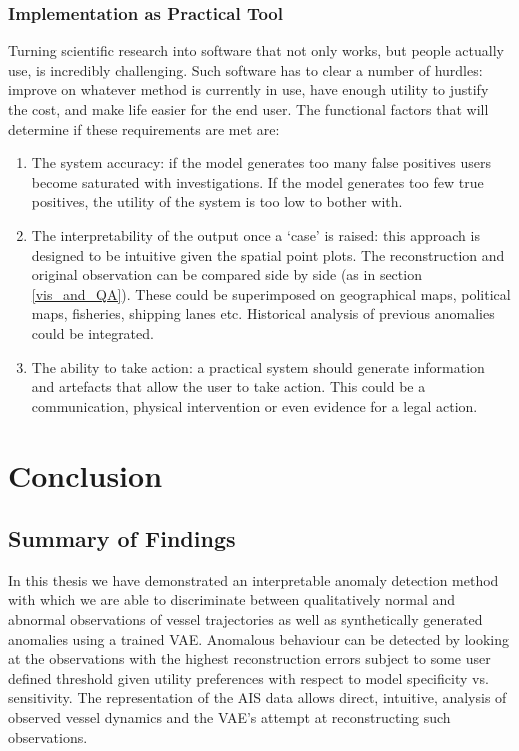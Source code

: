\documentclass{mldsmsc}
\begin{document}
\subsection{Implementation as Practical Tool}

Turning scientific research into software that not only works, but people actually use, is incredibly challenging. Such software has to clear a number of hurdles: improve on whatever method is currently in use, have enough utility to justify the cost, and make life easier for the end user. The functional factors that will determine if these requirements are met are: 

\begin{enumerate}
	\item The system accuracy: if the model generates too many false positives users become saturated with investigations. If the model generates too few true positives, the utility of the system is too low to bother with. 
	\item The interpretability of the output once a `case' is raised: this approach is designed to be intuitive given the spatial point plots. The reconstruction and original observation can be compared side by side (as in section \ref{vis_and_QA}). These could be superimposed on geographical maps, political maps, fisheries, shipping lanes etc. Historical analysis of previous anomalies could be integrated.
	\item The ability to take action: a practical system should generate information and artefacts that allow the user to take action. This could be a communication, physical intervention or even evidence for a legal action. 
\end{enumerate}

\chapter{Conclusion}
\section{Summary of Findings}

In this thesis we have demonstrated an interpretable anomaly detection method with which we are able to discriminate between qualitatively normal and abnormal observations of vessel trajectories as well as synthetically generated anomalies using a trained VAE. Anomalous behaviour can be detected by looking at the observations with the highest reconstruction errors subject to some user defined threshold given utility  preferences with respect to model specificity vs. sensitivity. The representation of the AIS data allows direct, intuitive, analysis of observed vessel dynamics and the VAE's attempt at reconstructing such observations. 
\end{document}
